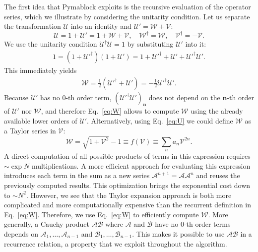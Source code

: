 The first idea that Pymablock exploits is the recursive evaluation of the operator series, which we illustrate by considering the unitarity condition.
Let us separate the transformation $\mathcal{U}$ into an identity and $\mathcal{U}' = \mathcal{W} + \mathcal{V}$:
%
\begin{equation}
\label{eq:U}
\mathcal{U} = 1 + \mathcal{U}' = 1 + \mathcal{W} + \mathcal{V},\quad \mathcal{W}^\dagger = \mathcal{W},\quad \mathcal{V}^\dagger = -\mathcal{V}.
\end{equation}
%
We use the unitarity condition $\mathcal{U}^\dagger \mathcal{U} = 1$ by substituting $\mathcal{U}'$ into it:
%
\begin{gather}
\label{eq:unitarity}
  1 = (1 + \mathcal{U}'^\dagger)(1+\mathcal{U}') = 1 + \mathcal{U}'^\dagger + \mathcal{U}' + \mathcal{U}'^\dagger \mathcal{U}'.
\end{gather}
%
This immediately yields \begin{gather}
\label{eq:W}
\mathcal{W} = \frac{1}{2}(\mathcal{U}'^\dagger + \mathcal{U}') = -\frac{1}{2} \mathcal{U}'^\dagger \mathcal{U}'.
\end{gather}
%
Because $\mathcal{U}'$ has no $0$-th order term, $(\mathcal{U}'^\dagger \mathcal{U}')_\mathbf{n}$ does not depend on the $\mathbf{n}$-th order of $\mathcal{U}'$ nor $\mathcal{W}$, and therefore Eq.~\eqref{eq:W} allows to compute $\mathcal{W}$ using the already available lower orders of $\mathcal{U}'$.
Alternatively, using Eq.~\eqref{eq:U} we could define $\mathcal{W}$ as a Taylor series in $\mathcal{V}$:
%
$$
\mathcal{W} = \sqrt{1 + \mathcal{V}^2} - 1 \equiv f(\mathcal{V}) \equiv \sum_n a_n \mathcal{V}^{2n}.
$$
%
A direct computation of all possible products of terms in this expression requires $\sim \exp N$ multiplications.
A more efficient approach for evaluating this expression introduces each term in the sum as a new series $\mathcal{A}^{n+1} = \mathcal{A}\mathcal{A}^{n}$ and reuses the previously computed results.
This optimization brings the exponential cost down to $\sim N^2$.
However, we see that the Taylor expansion approach is both more complicated and more computationally expensive than the recurrent definition in Eq.~\eqref{eq:W}.
Therefore, we use Eq.~\eqref{eq:W} to efficiently compute $\mathcal{W}$.
More generally, a Cauchy product $\mathcal{A}\mathcal{B}$ where $\mathcal{A}$ and $\mathcal{B}$ have no $0$-th order terms depends on $\mathcal{A}_1, \ldots, \mathcal{A}_{n-1}$ and $\mathcal{B}_1, \ldots, \mathcal{B}_{n-1}$.
This makes it possible to use $\mathcal{AB}$ in a recurrence relation, a property that we exploit throughout the algorithm.

